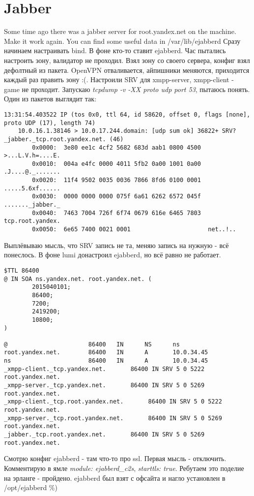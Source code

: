 \documentclass[a4paper,10pt]{report}
\begin{document}
\chapter{Jabber}
Some time ago there was a jabber server for root.yandex.net on the machine. Make it work again.
\newline
You can find some useful data in /var/lib/ejabberd
\newline\newline
Сразу начинаем настраивать bind. В фоне кто-то ставит ejabberd.
Час пытались настроить зону, валидатор не проходил. Взял зону со своего сервера, конфиг взял дефолтный из пакета.
OpenVPN отваливается, айпишники меняются, приходится каждый раз править зону :(. Настроили SRV для xmpp-server, xmpp-client - game не проходит.
Запускаю \textit{tcpdump -v -XX proto udp port 53}, пытаюсь понять. Один из пакетов выглядит так:
\begin{verbatim}
13:31:54.403522 IP (tos 0x0, ttl 64, id 58620, offset 0, flags [none], proto UDP (17), length 74)
    10.0.16.1.38146 > 10.0.17.244.domain: [udp sum ok] 36822+ SRV? _jabber._tcp.root.yandex.net. (46)
        0x0000:  3e80 ee1c 4cf2 5682 683d aab1 0800 4500  >...L.V.h=....E.
        0x0010:  004a e4fc 0000 4011 5fb2 0a00 1001 0a00  .J....@._.......
        0x0020:  11f4 9502 0035 0036 7866 8fd6 0100 0001  .....5.6xf......
        0x0030:  0000 0000 0000 075f 6a61 6262 6572 045f  ......._jabber._
        0x0040:  7463 7004 726f 6f74 0679 616e 6465 7803  tcp.root.yandex.
        0x0050:  6e65 7400 0021 0001                      net..!..
\end{verbatim}
Выплёвываю мысль, что SRV запись не та, меняю запись на нужную - всё понеслось. В фоне lumi донастроил ejabberd, но всё равно не работает.
\begin{verbatim}
$TTL 86400
@ IN SOA ns.yandex.net. root.yandex.net. (
        2015040101;
        86400;
        7200;
        2419200;
        10800;
)

@                       86400   IN      NS      ns
root.yandex.net.        86400   IN      A       10.0.34.45
ns                      86400   IN      A       10.0.34.45
_xmpp-client._tcp.yandex.net.       86400 IN SRV 5 0 5222 root.yandex.net.
_xmpp-server._tcp.yandex.net.       86400 IN SRV 5 0 5269 root.yandex.net.
_xmpp-client._tcp.root.yandex.net.       86400 IN SRV 5 0 5222 root.yandex.net.
_xmpp-server._tcp.root.yandex.net.       86400 IN SRV 5 0 5269 root.yandex.net.
_jabber._tcp.root.yandex.net.       86400 IN SRV 5 0 5269 root.yandex.net.
\end{verbatim}
Смотрю конфиг ejabberd - там что-то про ssl. Первая мысль - отключить.
Комментирую в ямле \textit{module: ejabberd\_c2s}, \textit{starttls: true}. Ребутаем это поделие на эрланге - пройдено.
ejabberd был взят с офсайта и нагло установлен в /opt/ejabberd \%)
\end{document}
